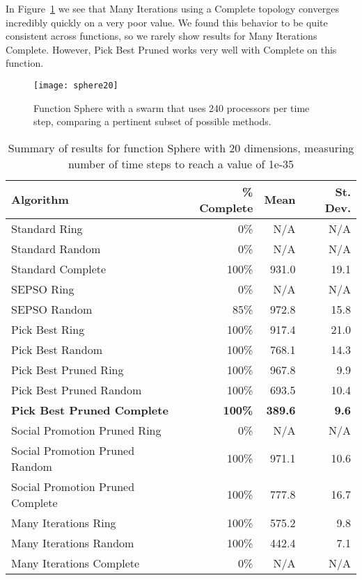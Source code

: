 \documentclass[smallcondensed]{svjour3}
\newcommand{\fig}[1]{Figure~\ref{fig:#1}}
\begin{document}
In \fig{sphere-20} we see that Many Iterations using a Complete topology
converges incredibly quickly on a very poor value.  We found this behavior to
be quite consistent across functions, so we rarely show results for Many
Iterations Complete.  However, Pick Best Pruned works very well with Complete
on this function.

\begin{figure}
  \centering
  \texttt{[image: sphere20]}
  \caption{Function Sphere with a swarm that uses 240 processors per time step,
  comparing a pertinent subset of possible methods.}
  \label{fig:sphere-20}
\end{figure}

\begin{table}
  \caption{Summary of results for function Sphere with 20 dimensions,
  measuring number of time steps to reach a value of 1e-35}
  \label{tab:sphere-20}
  \centering
  \begin{tabular}{|l|r|r|r|}
  \hline
  Algorithm&\% Complete&Mean&St. Dev.\\
  \hline
  \hline
  Standard Ring&0\%&N/A&N/A\\
  \hline
  Standard Random&0\%&N/A&N/A\\
  \hline
  Standard Complete&100\%&931.0&19.1\\
  \hline
  SEPSO Ring&0\%&N/A&N/A\\
  \hline
  SEPSO Random&85\%&972.8&15.8\\
  \hline
  Pick Best Ring&100\%&917.4&21.0\\
  \hline
  Pick Best Random&100\%&768.1&14.3\\
  \hline
  Pick Best Pruned Ring&100\%&967.8&9.9\\
  \hline
  Pick Best Pruned Random&100\%&693.5&10.4\\
  \hline
  \textbf{Pick Best Pruned Complete}&\textbf{100\%}&\textbf{389.6}&
    \textbf{9.6}\\
  \hline
  Social Promotion Pruned Ring&0\%&N/A&N/A\\
  \hline
  Social Promotion Pruned Random&100\%&971.1&10.6\\
  \hline
  Social Promotion Pruned Complete&100\%&777.8&16.7\\
  \hline
  Many Iterations Ring&100\%&575.2&9.8\\
  \hline
  Many Iterations Random&100\%&442.4&7.1\\
  \hline
  Many Iterations Complete&0\%&N/A&N/A\\
  \hline
  \end{tabular}
\end{table}
\end{document}
